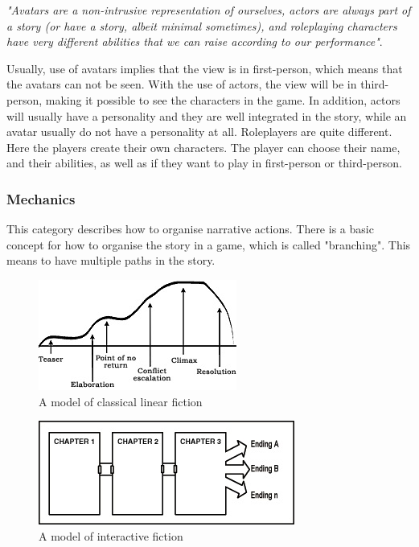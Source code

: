 \emph{"Avatars are a non-intrusive representation of ourselves, actors are always part of a story (or have a story, albeit minimal sometimes), and roleplaying characters have very different abilities that we can raise according to our performance"}. \cite{understandingvg}

Usually, use of avatars implies that the view is in first-person, which means that the avatars can not be seen. With the use of actors, the view will be in third-person, making it possible to see the characters in the game. In addition, actors will usually have a personality and they are well integrated in the story, while an avatar usually do not have a personality at all. Roleplayers are quite different. Here the players create their own characters. The player can choose their name, and their abilities, as well as if they want to play in first-person or third-person.  

\subsubsection{Mechanics}
This category describes how to organise narrative actions. There is a basic concept for how to organise the story in a game, which is called "branching". This means to have multiple paths in the story. 

\begin{figure}
\begin{center}
\includegraphics[scale=1.0]{linearFiction}
\caption[Classical linear fiction]{A model of classical linear fiction \cite{understandingvg}}
\label{fig:linearfiction}
\end{center}
\end{figure} 
\begin{figure}
\begin{center}
\includegraphics[scale=1.0]{interactiveFiction}
\caption[Interactive fiction]{A model of interactive fiction \cite{understandingvg}}
\label{fig:interactivefiction}
\end{center}
\end{figure} 

